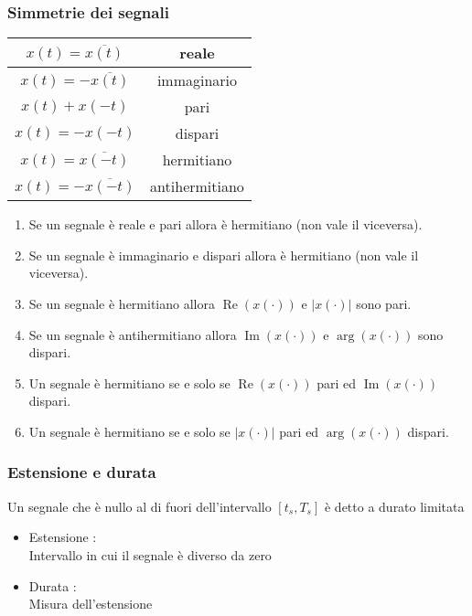 \documentclass{article}
\theoremstyle{definition}
\begin{document}
\subsubsection{Simmetrie dei segnali}
\begin{center}


\begin{tabular}{|c|c|}
	\hline
	$x(t)=\overline{x(t)}$ & reale   \\
	\hline
		$x(t)=-\overline{x(t)}$ & immaginario \\
	\hline
	$x(t)+x(-t)$& pari  \\
	\hline
	$x(t)=-x(-t)$& dispari  \\
	\hline
	 	$x(t)=\overline{x(-t)}$& hermitiano  \\
	\hline
	 	$x(t)=-\overline{x(-t)}$& antihermitiano   \\
	\hline
\end{tabular}
\end{center}
\begin{enumerate}
	\item Se un segnale è reale e pari allora è hermitiano (non vale il viceversa).
	\item Se un segnale è immaginario e dispari allora è hermitiano (non vale il viceversa).
	\item Se un segnale è hermitiano allora $\operatorname{Re}(x(\cdot))$ e $|x(\cdot)|$ sono pari.
	\item Se un segnale è antihermitiano allora $\operatorname{Im}(x(\cdot))$ e $\arg(x(\cdot))$ sono dispari.
	\item Un segnale è hermitiano se e solo se $\operatorname{Re}(x(\cdot))$ pari ed $\operatorname{Im}(x(\cdot))$ dispari.
	\item Un segnale è hermitiano se e solo se $|x(\cdot)|$ pari ed $\arg(x(\cdot))$ dispari.
\end{enumerate}
\subsubsection{Estensione e durata}
Un segnale che è nullo al di fuori dell'intervallo $\left[t_s,T_s\right]$ è detto a durato limitata 
\begin{itemize}
	\item Estensione : \\
	Intervallo in cui il segnale è diverso da zero 
	\item Durata : \\
	Misura dell'estensione 
\end{itemize}
\end{document}
